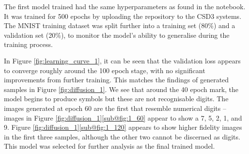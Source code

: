 \documentclass[12pt]{article}
\begin{document}
The first model trained had the same hyperparameters as found in the notebook.
It was trained for 500 epochs by uploading the repository to the CSD3 systems.
The MNIST training dataset was split further into a training set (80\%) and a validation set (20\%),
to monitor the model's ability to generalise during the training process.

In Figure \ref{fig:learning_curve_1}, it can be seen that the validation loss appears to converge roughly around the 100 epoch stage,
with no significant improvements from further training.
This matches the findings of generated samples in Figure \ref{fig:diffusion_1}.
We see that around the 40 epoch mark, the model begins to produce symbols but these are not recognisable digits.
The images generated at epoch 60 are the first that resemble numerical digits --
images in Figure \ref{fig:diffusion_1}\ref{sub@fig:1_60} appear to show a 7, 5, 2, 1, and 9.
Figure \ref{fig:diffusion_1}\ref{sub@fig:1_120} appears to show higher fidelity images in the first three samples,
although the other two cannot be discerned as digits.
This model was selected for further analysis as the final trained model.
\end{document}

